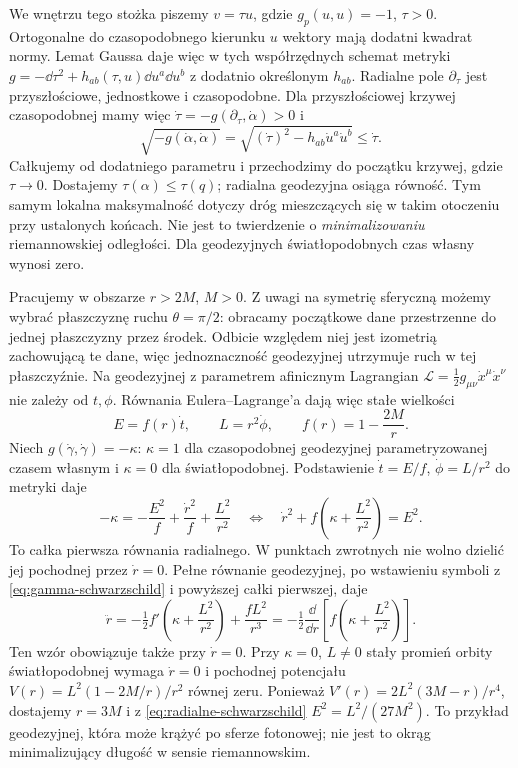 We wnętrzu tego stożka
piszemy $v=\tau u$, gdzie $g_p(u,u)=-1$,
$\tau>0$. Ortogonalne do czasopodobnego
kierunku $u$ wektory mają dodatni kwadrat
normy. Lemat Gaussa daje więc w tych
współrzędnych schemat metryki
$g=-\dd\tau^2+h_{ab}(\tau,u)\dd u^a\dd u^b$
z dodatnio określonym $h_{ab}$.
Radialne pole $\partial_\tau$ jest przyszłościowe,
jednostkowe i czasopodobne. Dla przyszłościowej krzywej
czasopodobnej mamy więc $\dot\tau=-g(\partial_\tau,\dot\alpha)>0$ i
\[
 \sqrt{-g(\dot\alpha,\dot\alpha)}
 =\sqrt{(\dot\tau)^2-h_{ab}\dot u^a\dot u^b}
 \leq\dot\tau.
\]
Całkujemy od dodatniego parametru i przechodzimy do początku
krzywej, gdzie $\tau\to0$. Dostajemy $\tau(\alpha)
\leq\tau(q)$; radialna geodezyjna osiąga
równość. Tym samym lokalna maksymalność
dotyczy dróg mieszczących się w takim
otoczeniu przy ustalonych końcach.
Nie jest to twierdzenie o \emph{minimalizowaniu}
riemannowskiej odległości. Dla geodezyjnych
światłopodobnych czas własny wynosi zero.

\begin{przyklad}
\label{prz:geodezyjne-schwarzschild}
Pracujemy w obszarze $r>2M$, $M>0$. Z uwagi na symetrię
sferyczną możemy wybrać płaszczyznę ruchu $\theta=\pi/2$:
obracamy początkowe dane przestrzenne do jednej płaszczyzny
przez środek. Odbicie względem niej jest izometrią
zachowującą te dane, więc jednoznaczność geodezyjnej
utrzymuje ruch w tej płaszczyźnie.
Na geodezyjnej z parametrem afinicznym
Lagrangian $\mathcal L=\tfrac12g_{\mu\nu}
\dot x^\mu\dot x^\nu$ nie zależy od $t,\phi$.
Równania Eulera--Lagrange'a dają więc
stałe wielkości
\begin{equation}\label{eq:stale-schwarzschild}
 E=f(r)\dot t,\qquad L=r^2\dot\phi,
 \qquad f(r)=1-\frac{2M}{r}.
\end{equation}
Niech $g(\dot\gamma,\dot\gamma)=-\kappa$:
$\kappa=1$ dla czasopodobnej geodezyjnej
parametryzowanej czasem własnym i $\kappa=0$
dla światłopodobnej. Podstawienie
$\dot t=E/f$, $\dot\phi=L/r^2$ do metryki daje
\begin{equation}\label{eq:radialne-schwarzschild}
 -\kappa=-\frac{E^2}{f}+\frac{\dot r^2}{f}
                   +\frac{L^2}{r^2}
 \quad\Longleftrightarrow\quad
 \dot r^2+f\left(\kappa+\frac{L^2}{r^2}\right)=E^2.
\end{equation}
To całka pierwsza równania radialnego. W punktach zwrotnych
nie wolno dzielić jej pochodnej przez $\dot r=0$.
Pełne równanie geodezyjnej, po wstawieniu symboli
z \eqref{eq:gamma-schwarzschild} i powyższej całki pierwszej, daje
\[
 \ddot r=-\tfrac12 f'\left(\kappa+\frac{L^2}{r^2}\right)
                  +\frac{fL^2}{r^3}
        =-\tfrac12\frac{\dd}{\dd r}
                    \left[f\left(\kappa+\frac{L^2}{r^2}\right)\right].
\]
Ten wzór obowiązuje także przy $\dot r=0$.
Przy $\kappa=0$, $L\ne0$ stały promień
orbity światłopodobnej wymaga $\dot r=0$
i pochodnej potencjału
$V(r)=L^2(1-2M/r)/r^2$ równej zeru.
Ponieważ
$V'(r)=2L^2(3M-r)/r^4$, dostajemy
$r=3M$ i z \eqref{eq:radialne-schwarzschild}
$E^2=L^2/(27M^2)$. To przykład geodezyjnej,
która może krążyć po sferze fotonowej;
nie jest to okrąg minimalizujący długość
w sensie riemannowskim.
\end{przyklad}

